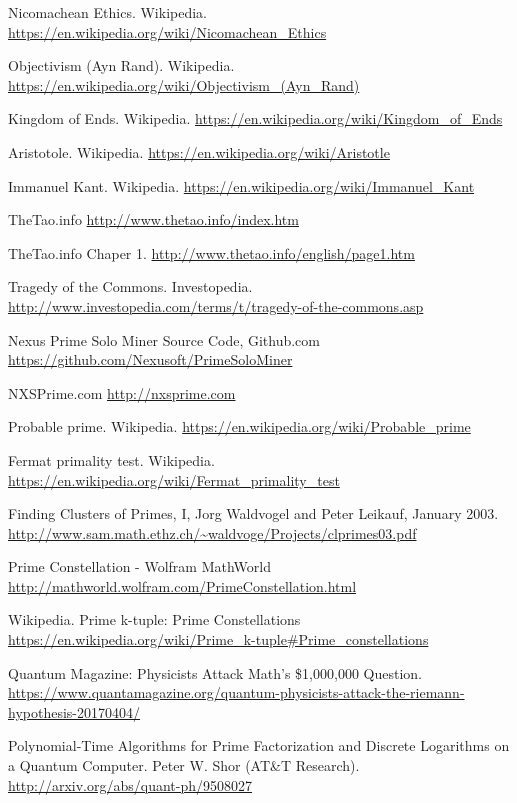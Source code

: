 \documentclass[11pt]{article}
\begin{document}
\begin{thebibliography}{7}
Nicomachean Ethics. Wikipedia.
\url{https://en.wikipedia.org/wiki/Nicomachean_Ethics}

Objectivism (Ayn Rand). Wikipedia.
\url{https://en.wikipedia.org/wiki/Objectivism_(Ayn_Rand)}

Kingdom of Ends. Wikipedia.
\url{https://en.wikipedia.org/wiki/Kingdom_of_Ends}

Aristotole. Wikipedia.
\url{https://en.wikipedia.org/wiki/Aristotle}

Immanuel Kant. Wikipedia.
\url{https://en.wikipedia.org/wiki/Immanuel_Kant}

TheTao.info
\url{http://www.thetao.info/index.htm}

TheTao.info Chaper 1.
\url{http://www.thetao.info/english/page1.htm}

Tragedy of the Commons. Investopedia.
\url{http://www.investopedia.com/terms/t/tragedy-of-the-commons.asp}

Nexus Prime Solo Miner Source Code, Github.com
\url{https://github.com/Nexusoft/PrimeSoloMiner}

NXSPrime.com
\url{http://nxsprime.com}

Probable prime. Wikipedia.
\url{https://en.wikipedia.org/wiki/Probable_prime}

Fermat primality test. Wikipedia.
\url{https://en.wikipedia.org/wiki/Fermat_primality_test}

Finding Clusters of Primes, I, Jorg Waldvogel and Peter Leikauf, January 2003.
\url{http://www.sam.math.ethz.ch/~waldvoge/Projects/clprimes03.pdf}

Prime Constellation - Wolfram MathWorld
\url{http://mathworld.wolfram.com/PrimeConstellation.html}

Wikipedia. Prime k-tuple: Prime Constellations
\url{https://en.wikipedia.org/wiki/Prime_k-tuple#Prime_constellations}

Quantum Magazine: Physicists Attack Math's \$1,000,000 Question.
\url{https://www.quantamagazine.org/quantum-physicists-attack-the-riemann-hypothesis-20170404/}

Polynomial-Time Algorithms for Prime Factorization and Discrete Logarithms on a Quantum Computer. Peter W. Shor (AT\&T Research).
\url{http://arxiv.org/abs/quant-ph/9508027}


\end{thebibliography}
\end{document}
